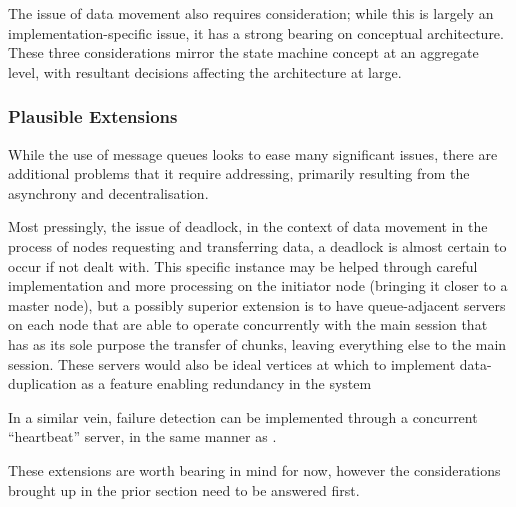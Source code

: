 The issue of data movement also requires consideration; while this is largely an implementation-specific issue, it has a strong bearing on conceptual architecture.
These three considerations mirror the state machine concept at an aggregate level, with resultant decisions affecting the architecture at large.

\subsubsection{Plausible Extensions}\label{plausible-extensions}

While the use of message queues looks to ease many significant issues, there are additional problems that it require addressing, primarily resulting from the asynchrony and decentralisation.

Most pressingly, the issue of deadlock, in the context of data movement in the process of nodes requesting and transferring data, a deadlock is almost certain to occur if not dealt with.
This specific instance may be helped through careful implementation and more processing on the initiator node (bringing it closer to a master node), but a possibly superior extension is to have queue-adjacent servers on each node that are able to operate concurrently with the main \R{} session that has as its sole purpose the transfer of chunks, leaving everything else to the main \R{} session.
These servers would also be ideal vertices at which to implement data-duplication as a feature enabling redundancy in the system

In a similar vein, failure detection can be implemented through a concurrent ``heartbeat'' server, in the same manner as  \cite{white2012hadoop}.

These extensions are worth bearing in mind for now, however the considerations brought up in the prior section need to be answered first.
